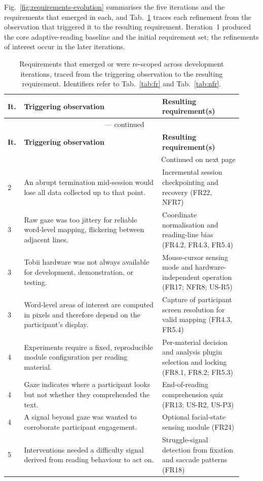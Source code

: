 Fig.~\ref{fig:requirements-evolution} summarises the five iterations and the requirements that emerged in each, and Tab.~\ref{tab:req-evolution} traces each refinement from the observation that triggered it to the resulting requirement.
Iteration~1 produced the core adaptive-reading baseline and the initial requirement set; the refinements of interest occur in the later iterations.

\begingroup
\small
\begin{longtable}{@{} p{0.05\linewidth} p{0.55\linewidth} p{0.32\linewidth} @{}}
\caption[Requirements that emerged or were re-scoped across iterations.]{Requirements that emerged or were re-scoped across development iterations, traced from the triggering observation to the resulting requirement. Identifiers refer to Tab.~\ref{tab:fr} and Tab.~\ref{tab:nfr}.}
\label{tab:req-evolution} \\
\toprule
\textbf{It.} & \textbf{Triggering observation} & \textbf{Resulting requirement(s)} \\
\midrule
\endfirsthead

\multicolumn{3}{c}{\tablename~\thetable{} --- continued} \\
\toprule
\textbf{It.} & \textbf{Triggering observation} & \textbf{Resulting requirement(s)} \\
\midrule
\endhead

\midrule
\multicolumn{3}{r}{\footnotesize Continued on next page} \\
\endfoot

\bottomrule
\endlastfoot

2 & An abrupt termination mid-session would lose all data collected up to that point. & Incremental session checkpointing and recovery (FR22, NFR7) \\[2pt]
3 & Raw gaze was too jittery for reliable word-level mapping, flickering between adjacent lines. & Coordinate normalisation and reading-line bias (FR4.2, FR4.3, FR5.4) \\[2pt]
3 & Tobii hardware was not always available for development, demonstration, or testing. & Mouse-cursor sensing mode and hardware-independent operation (FR17; NFR8; US-R5) \\[2pt]
3 & Word-level areas of interest are computed in pixels and therefore depend on the participant's display. & Capture of participant screen resolution for valid mapping (FR4.3, FR5.4) \\[2pt]
4 & Experiments require a fixed, reproducible module configuration per reading material. & Per-material decision and analysis plugin selection and locking (FR8.1, FR8.2; FR5.3) \\[2pt]
4 & Gaze indicates where a participant looks but not whether they comprehended the text. & End-of-reading comprehension quiz (FR13; US-R2, US-P3) \\[2pt]
4 & A signal beyond gaze was wanted to corroborate participant engagement. & Optional facial-state sensing module (FR24) \\[2pt]
5 & Interventions needed a difficulty signal derived from reading behaviour to act on. & Struggle-signal detection from fixation and saccade patterns (FR18) \\

\end{longtable}
